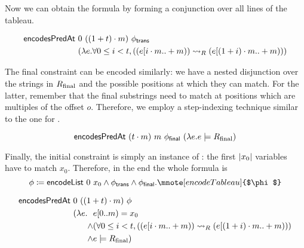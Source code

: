 Now we can obtain the formula  by forming a conjunction over all lines of the tableau.
\begin{lemma}
  \begin{align*}
    \textsf{encodesPredAt}~&0~((1 +{t}) \cdot m)~\phi_{\textsf{trans}} \\
                                                   &(\lambda e. \forall 0 \le i < t, ((e[i \cdot m..+m)) \rightsquigarrow_{R} (e[(1 +{i}) \cdot m ..+m)))
  \end{align*}
\end{lemma}

The final constraint can be encoded similarly: we have a nested disjunction over the strings in $R_{\text{final}}$ and the possible positions at which they can match. For the latter, remember that the final substrings need to match at positions which are multiples of the offset $o$. Therefore, we employ a step-indexing technique similar to the one for \encodeWindowsLine. 

\begin{lemma}
  \[\textsf{encodesPredAt}~(t \cdot m)~m~\phi_{\textsf{final}}~(\lambda e. e \models R_{\text{final}}) \]
\end{lemma}

Finally, the initial constraint is simply an instance of \encodeList: the first $|x_0|$ variables have to match $x_0$. 
Therefore, in the end the whole formula is
\[ \phi \defeq \encodeList~0~x_0 \land \phi_{\textsf{trans}} \land \phi_{\textsf{final}}.\mnote[encodeTableau]{$\phi$} \]

\begin{lemma}\label{lem:phi_correct}
  \begin{align*}
    \textsf{encodesPredAt}~&0~((1 +{t}) \cdot m)~\phi \\
                 &(\lambda e. \begin{aligned}[t]
                  &e[0..m) = x_0 \\
                   \land &  (\forall 0 \le i < t, ((e[i \cdot m..+m)) \rightsquigarrow_{R} (e[(1 +{i}) \cdot m..+m))) \\
                  \land & e \models R_{\text{final}})
                \end{aligned}
  \end{align*}
\end{lemma}

